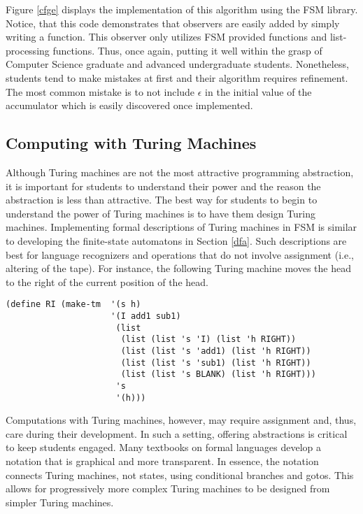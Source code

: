 \documentclass{eptcs}
\begin{document}
Figure \ref{cfge} displays the implementation of this algorithm using the \textsf{FSM} library. Notice, that this code demonstrates that observers are easily added by simply writing a function. This observer only utilizes \textsf{FSM} provided functions and list-processing functions. Thus, once again, putting it well within the grasp of Computer Science graduate and advanced undergraduate students. Nonetheless, students tend to make mistakes at first and their algorithm requires refinement. The most common mistake is to not include $\epsilon$ in the initial value of the accumulator which is easily discovered once implemented.

\subsection{Computing with Turing Machines}
Although Turing machines are not the most attractive programming abstraction, it is important for students to understand their power and the reason the abstraction is less than attractive. The best way for students to begin to understand the power of Turing machines is to have them design Turing machines. Implementing formal descriptions of Turing machines in \textsf{FSM} is similar to developing the finite-state automatons in Section \ref{dfa}. Such descriptions are best for language recognizers and operations that do not involve assignment (i.e., altering of the tape). For instance, the following Turing machine moves the head to the right of the current position of the head.

\begin{verbatim}
(define RI (make-tm  '(s h)
                     '(I add1 sub1)
                      (list
                       (list (list 's 'I) (list 'h RIGHT))
                       (list (list 's 'add1) (list 'h RIGHT))
                       (list (list 's 'sub1) (list 'h RIGHT))
                       (list (list 's BLANK) (list 'h RIGHT)))
                      's
                      '(h)))
\end{verbatim}

Computations with Turing machines, however, may require assignment and, thus, care during their development. In such a setting, offering abstractions is critical  to keep students engaged. Many textbooks on formal languages develop a notation that is graphical and more transparent. In essence, the notation connects Turing machines, not states, using conditional branches and gotos. This allows for progressively more complex Turing machines to be designed from simpler Turing machines.
\end{document}
